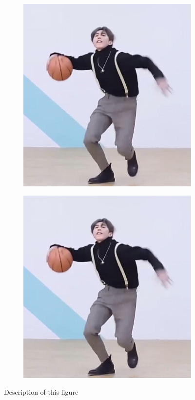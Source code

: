 \begin{figure}[H]
{\begin{subfigure}{0.3 \textwidth}
    {\includegraphics[width=\textwidth]{figures/fig02/2.5.png}
    \caption{}\label{Fig.2.1.b}}
\end{subfigure}
%
\begin{subfigure}{0.3 \textwidth}
    \centering
    {\includegraphics[width=\textwidth]{figures/fig02/2.5.png}
    \caption{}\label{Fig.2.1.c}}
\end{subfigure}

\caption{Description of this figure}
\label{Fig.2.1}
}
\end{figure}
%
